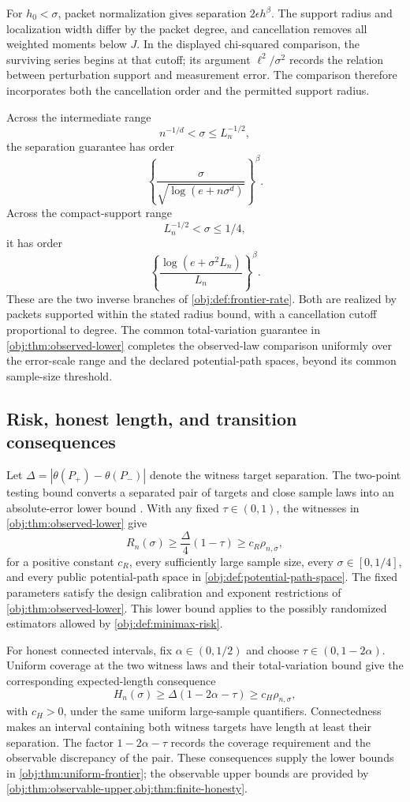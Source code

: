 \documentclass[11pt]{article}
\begin{document}
For \(h_0<\sigma\), packet normalization gives separation \(2\epsilon h^\beta\). The support radius and localization width differ by the packet degree, and cancellation removes all weighted moments below \(J\). In the displayed chi-squared comparison, the surviving series begins at that cutoff; its argument \(\ell^2/\sigma^2\) records the relation between perturbation support and measurement error. The comparison therefore incorporates both the cancellation order and the permitted support radius.

Across the intermediate range
\[
n^{-1/d}<\sigma\le L_n^{-1/2},
\]
the separation guarantee has order
\[
\left\{\frac{\sigma}{\sqrt{\log(e+n\sigma^d)}}\right\}^{\beta}.
\]
Across the compact-support range
\[
L_n^{-1/2}<\sigma\le1/4,
\]
it has order
\[
\left\{\frac{\log(e+\sigma^2L_n)}{L_n}\right\}^{\beta}.
\]
These are the two inverse branches of \cref{obj:def:frontier-rate}. Both are realized by packets supported within the stated radius bound, with a cancellation cutoff proportional to degree. The common total-variation guarantee in \cref{obj:thm:observed-lower} completes the observed-law comparison uniformly over the error-scale range and the declared potential-path spaces, beyond its common sample-size threshold.

\subsection{Risk, honest length, and transition consequences}

Let \(\Delta=|\theta(P_+)-\theta(P_-)|\) denote the witness target separation. The two-point testing bound converts a separated pair of targets and close sample laws into an absolute-error lower bound \citep[Section 2.2, Theorem 2.2]{Tsybakov2009}. With any fixed \(\tau\in(0,1)\), the witnesses in \cref{obj:thm:observed-lower} give
\[
R_n(\sigma)\ge \frac{\Delta}{4}(1-\tau)
\ge c_R\rho_{n,\sigma},
\]
for a positive constant \(c_R\), every sufficiently large sample size, every \(\sigma\in[0,1/4]\), and every public potential-path space in \cref{obj:def:potential-path-space}. The fixed parameters satisfy the design calibration and exponent restrictions of \cref{obj:thm:observed-lower}. This lower bound applies to the possibly randomized estimators allowed by \cref{obj:def:minimax-risk}.

For honest connected intervals, fix \(\alpha\in(0,1/2)\) and choose \(\tau\in(0,1-2\alpha)\). Uniform coverage at the two witness laws and their total-variation bound give the corresponding expected-length consequence
\[
H_n(\sigma)\ge \Delta(1-2\alpha-\tau)
\ge c_H\rho_{n,\sigma},
\]
with \(c_H>0\), under the same uniform large-sample quantifiers. Connectedness makes an interval containing both witness targets have length at least their separation. The factor \(1-2\alpha-\tau\) records the coverage requirement and the observable discrepancy of the pair. These consequences supply the lower bounds in \cref{obj:thm:uniform-frontier}; the observable upper bounds are provided by \cref{obj:thm:observable-upper,obj:thm:finite-honesty}.
\end{document}
